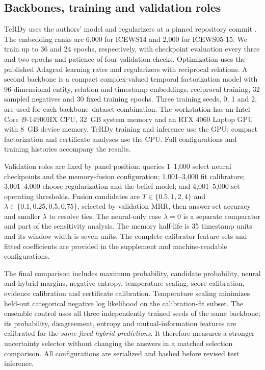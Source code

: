 \subsection{Backbones, training and validation roles}
TeRDy uses the authors' model and regularizers at a pinned repository commit \citep{liu2025terdy}. The embedding ranks are 6,000 for ICEWS14 and 2,000 for ICEWS05-15. We train up to 36 and 24 epochs, respectively, with checkpoint evaluation every three and two epochs and patience of four validation checks. Optimization uses the published Adagrad learning rates and regularizers with reciprocal relations. A second backbone is a compact complex-valued temporal factorization model with 96-dimensional entity, relation and timestamp embeddings, reciprocal training, 32 sampled negatives and 30 fixed training epochs. Three training seeds, 0, 1 and 2, are used for each backbone--dataset combination. The workstation has an Intel Core i9-14900HX CPU, 32~GB system memory and an RTX 4060 Laptop GPU with 8~GB device memory. TeRDy training and inference use the GPU; compact factorization and certificate analyses use the CPU. Full configurations and training histories accompany the results.

Validation roles are fixed by panel position: queries 1--1,000 select neural checkpoints and the memory-fusion configuration; 1,001--3,000 fit calibrators; 3,001--4,000 choose regularization and the belief model; and 4,001--5,000 set operating thresholds. Fusion candidates are $T\in\{0.5,1,2,4\}$ and $\lambda\in\{0.1,0.25,0.5,0.75\}$, selected by validation MRR, then answer-set accuracy and smaller $\lambda$ to resolve ties. The neural-only case $\lambda=0$ is a separate comparator and part of the sensitivity analysis. The memory half-life is 35 timestamp units and its window width is seven units. The complete calibrator feature sets and fitted coefficients are provided in the supplement and machine-readable configurations.

The final comparison includes maximum probability, candidate probability, neural and hybrid margins, negative entropy, temperature scaling, score calibration, evidence calibration and certificate calibration. Temperature scaling minimizes held-out categorical negative log likelihood on the calibration-fit subset. The ensemble control uses all three independently trained seeds of the same backbone; its probability, disagreement, entropy and mutual-information features are calibrated for the \emph{same fixed hybrid predictions}. It therefore measures a stronger uncertainty selector without changing the answers in a matched selection comparison. All configurations are serialized and hashed before revised test inference.

